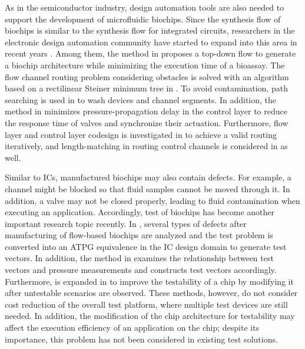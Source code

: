 As in the semiconductor industry, design automation tools are also needed to
support the development of microfluidic biochips.  Since the synthesis flow of
biochips is similar to the synthesis flow for integrated circuits,
researchers in the electronic design automation community
have started to expand into this area in recent years
\cite{ChakrabartyFZ10,PopAC15}. Among them, the method in \cite{MinhassPMB12}
proposes a top-down flow to generate a biochip architecture while minimizing
the execution time of a bioassay. The flow channel routing problem considering
obstacles is solved with an algorithm based on a rectilinear Steiner minimum
tree in \cite{LinLCLH14}. To avoid contamination, path searching is used in
\cite{HuHC16} to wash devices and channel segments. 
%
In addition, the method 
in \cite{HuDHC17} minimizes pressure-propagation delay in the control layer to
reduce the response time of valves and synchronize their actuation.
Furthermore, flow layer and control layer codesign is investigated in
\cite{YaoWRCH15} to achieve a valid routing 
iteratively, and length-matching in routing control channels is considered in
\cite{YaoHC15} as well. 

Similar to ICs, manufactured biochips may also contain defects. For example, a
channel might be blocked so that fluid samples cannot be moved through it. In
addition, a valve may not be closed properly, leading to fluid contamination
when executing an application. Accordingly, test of biochips has become
another important research topic recently.  In \cite{HuYHC14}, several types of
defects after manufacturing of flow-based biochips are analyzed and the test
problem is converted into an ATPG equivalence in the IC design domain to
generate test vectors.  In addition, the method in  \cite{LLHS17} examines
the relationship between test vectors and pressure measurements and
constructs test vectors accordingly.  Furthermore, \cite{HuYHC14} is expanded
in \cite{HuHC14} to improve the testability of a chip by modifying it after
untestable scenarios are observed.  These methods, however, do not consider
cost reduction of the overall test platform, where multiple test devices are
still needed.  In addition, the modification of the chip architecture for
testability may affect the execution efficiency of an application on
the chip; despite its importance, this problem has not been
considered in existing test solutions.

